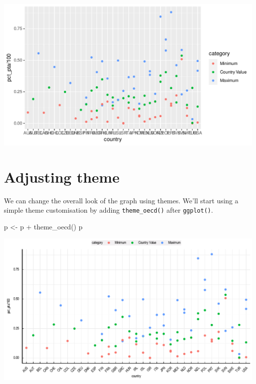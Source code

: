 \documentclass[
  11pt,
  oneside]{report}
\newenvironment{Shaded}{\begin{snugshade}}{\end{snugshade}}
\newcommand{\FunctionTok}[1]{\textcolor[rgb]{0.00,0.00,0.00}{#1}}
\newcommand{\NormalTok}[1]{#1}
\newcommand{\OtherTok}[1]{\textcolor[rgb]{0.56,0.35,0.01}{#1}}
\newcommand{\SpecialCharTok}[1]{\textcolor[rgb]{0.00,0.00,0.00}{#1}}
\begin{document}
\begin{center}\includegraphics{book_figures/scatterplot_1-1} \end{center}

\hypertarget{adjusting-theme-1}{%
\section{Adjusting theme}\label{adjusting-theme-1}}

We can change the overall look of the graph using themes. We'll start
using a simple theme customisation by adding \texttt{theme\_oecd()}
after \texttt{ggplot()}.

\begin{Shaded}
\begin{Highlighting}[]
\NormalTok{p }\OtherTok{\textless{}{-}}\NormalTok{ p }\SpecialCharTok{+}
  \FunctionTok{theme\_oecd}\NormalTok{()}
\NormalTok{p}
\end{Highlighting}
\end{Shaded}

\begin{center}\includegraphics{book_figures/scatterplot_2-1} \end{center}
\end{document}
